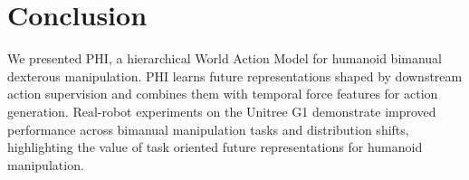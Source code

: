 \documentclass{article} %
\begin{document}



\section{Conclusion}

We presented PHI, a hierarchical World Action Model for humanoid bimanual dexterous manipulation. PHI learns future representations shaped by downstream action supervision and combines them with temporal force features for action generation. Real-robot experiments on the Unitree G1 demonstrate improved performance across bimanual manipulation tasks and distribution shifts, highlighting the value of task oriented future representations for humanoid manipulation.



\end{document}
